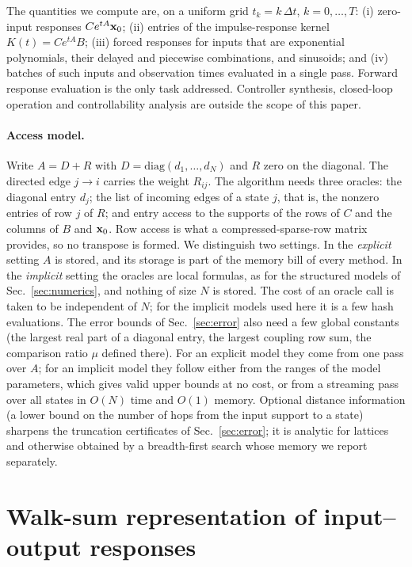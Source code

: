 \documentclass[aps,pra,superscriptaddress,floatfix,longbibliography,twocolumn]{revtex4-2}
\newcommand{\bx}{{\bf x}}
\begin{document}
The quantities we compute are, on a uniform grid $t_k=k\,\Delta t$, $k=0,\dots,T$:
(i) zero-input responses $C e^{tA}\bx_0$;
(ii) entries of the impulse-response kernel $K(t)=Ce^{tA}B$;
(iii) forced responses for inputs that are exponential polynomials, their delayed and piecewise combinations, and sinusoids; and
(iv) batches of such inputs and observation times evaluated in a single pass.
Forward response evaluation is the only task addressed. Controller synthesis, closed-loop operation and controllability analysis are outside the scope of this paper.

\paragraph*{Access model.} Write $A=D+R$ with $D=\mathrm{diag}(d_1,\dots,d_N)$ and $R$ zero on the diagonal. The directed edge $j\to i$ carries the weight $R_{ij}$. The algorithm needs three oracles: the diagonal entry $d_j$; the list of incoming edges of a state $j$, that is, the nonzero entries of row $j$ of $R$; and entry access to the supports of the rows of $C$ and the columns of $B$ and $\bx_0$. Row access is what a compressed-sparse-row matrix provides, so no transpose is formed. We distinguish two settings. In the \emph{explicit} setting $A$ is stored, and its storage is part of the memory bill of every method. In the \emph{implicit} setting the oracles are local formulas, as for the structured models of Sec.~\ref{sec:numerics}, and nothing of size $N$ is stored. The cost of an oracle call is taken to be independent of $N$; for the implicit models used here it is a few hash evaluations. The error bounds of Sec.~\ref{sec:error} also need a few global constants (the largest real part of a diagonal entry, the largest coupling row sum, the comparison ratio $\mu$ defined there). For an explicit model they come from one pass over $A$; for an implicit model they follow either from the ranges of the model parameters, which gives valid upper bounds at no cost, or from a streaming pass over all states in $O(N)$ time and $O(1)$ memory. Optional distance information (a lower bound on the number of hops from the input support to a state) sharpens the truncation certificates of Sec.~\ref{sec:error}; it is analytic for lattices and otherwise obtained by a breadth-first search whose memory we report separately.

\section{Walk-sum representation of input--output responses}\label{sec:representation}
\end{document}
